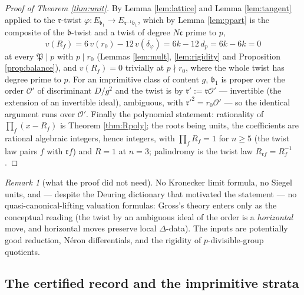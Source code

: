 \documentclass[11pt]{amsart}
\numberwithin{equation}{section}
\theoremstyle{plain}
\theoremstyle{definition}
\theoremstyle{remark}
\newtheorem{remark}[theorem]{Remark}
\newcommand{\idealb}{\mathfrak{b}}
\newcommand{\idealc}{\mathfrak{c}}
\newcommand{\idealP}{\mathfrak{P}}
\newcommand{\idealr}{\mathfrak{r}}
\newcommand{\Oc}{\mathcal{O}}
\begin{document}
\begin{proof}[Proof of Theorem \ref{thm:unit}]
By Lemma \ref{lem:lattice} and Lemma \ref{lem:tangent} applied to the
$\idealr$-twist $\varphi: E_{\idealb_1} \to E_{\idealr^{-1}\idealb_1}$,
which by Lemma \ref{lem:ppart} is the composite of the $\idealb$-twist
and a twist of degree $N\idealc$ prime to $p$,
\[
  v(R_f) = 6\,v(r_0) - 12\,v(\delta_\varphi) = 6k - 12\,d_p = 6k - 6k = 0
\]
at every $\idealP \mid p$ with $p \mid r_0$ (Lemmas \ref{lem:mult},
\ref{lem:rigidity} and Proposition \ref{prop:balance}), and $v(R_f) = 0$
trivially at $p \nmid r_0$, where the whole twist has degree prime to
$p$.  For an imprimitive class of content $g$, $\idealb_1$ is proper over
the order $\Oc'$ of discriminant $D/g^2$ and the twist is by $\idealr' :=
\idealr\Oc'$ --- invertible (the extension of an invertible ideal),
ambiguous, with $\idealr'^2 = r_0\Oc'$ --- so the identical argument runs
over $\Oc'$.  Finally the polynomial statement: rationality of
$\prod_f(x - R_f)$ is Theorem \ref{thm:Rpoly}; the roots being units, the
coefficients are rational algebraic integers, hence integers, with
$\prod_fR_f = 1$ for $n \ge 5$ (the twist law pairs $f$ with $\idealr f$)
and $R = 1$ at $n = 3$; palindromy is the twist law $R_{\idealr f} =
R_f^{-1}$.
\end{proof}

\begin{remark}[what the proof did not need]\label{rem:notneeded}
No Kronecker limit formula, no Siegel units, and --- despite the Deuring
dictionary that motivated the statement --- no quasi-canonical-lifting
valuation formulas: Gross's theory \cite{Gross1986} enters only as the
conceptual reading (the twist by an ambiguous ideal of the order is a
\emph{horizontal} move, and horizontal moves preserve local
$\Delta$-data).  The inputs are potentially good reduction, N\'eron
differentials, and the rigidity of $p$-divisible-group quotients.
\end{remark}

\subsection{The certified record and the imprimitive strata}
\label{subsec:unitrecord}
\end{document}
